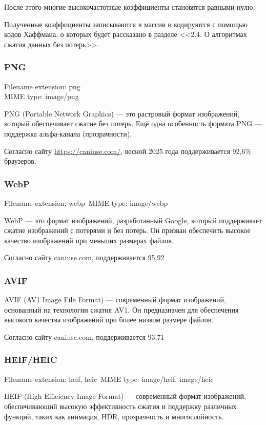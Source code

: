 \documentclass[12pt]{article}
\begin{document}
После этого многие высокочастотные коэффициенты становятся равными нулю.

Полученные коэффициенты записываются в массив и кодируются с помощью кодов Хаффмана,  
о которых будет рассказано в разделе <<2.4. О алгоритмах сжатия данных без потерь>>.

\subsubsection{PNG}

Filename extension: png\\
MIME type: image/png

PNG (Portable Network Graphics) — это растровый формат изображений, который обеспечивает сжатие  
без потерь. Ещё одна особенность формата PNG — поддержка альфа-канала (прозрачности).

Согласно сайту \url{https://caniuse.com/}, весной 2025 года поддерживается 92{,}6\% браузеров.

\subsubsection{WebP}
Filename extension: webp\
MIME type: image/webp

WebP — это формат изображений, разработанный Google, который поддерживает сжатие изображений
с потерями и без потерь. Он призван обеспечить высокое качество изображений при меньших размерах файлов.\

Согласно сайту caniuse.com, поддерживается 95,92%

\subsubsection{AVIF}

AVIF (AV1 Image File Format) — современный формат изображений,
основанный на технологии сжатия AV1. Он предназначен для обеспечения высокого
качества изображений при более низком размере файлов.

Согласно сайту caniuse.com, поддерживается 93,71%

\subsubsection{HEIF/HEIC}
Filename extension: heif, heic\
MIME type: image/heif, image/heic\

HEIF (High Efficiency Image Format) — современный формат изображений,
обеспечивающий высокую эффективность сжатия и поддержку различных функций,
таких как анимация, HDR, прозрачность и многослойность.
\end{document}
